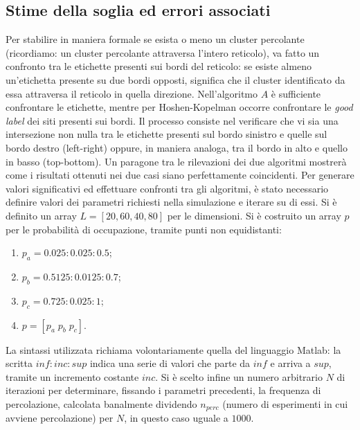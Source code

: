 \subsection*{Stime della soglia ed errori associati}
Per stabilire in maniera formale se esista o meno un cluster percolante (ricordiamo: un cluster 
percolante attraversa l'intero reticolo), va fatto un confronto tra le etichette presenti sui bordi
del reticolo: se esiste almeno un'etichetta presente su due bordi opposti, significa che il cluster 
identificato da essa attraversa il reticolo in quella direzione. 
Nell'algoritmo $A$ è sufficiente confrontare le etichette, mentre per Hoshen-Kopelman occorre 
confrontare le \textit{good label} dei siti presenti sui bordi.
Il processo consiste nel verificare che vi sia una intersezione non nulla tra le etichette 
presenti sul bordo sinistro e quelle sul bordo destro (left-right) oppure, in maniera analoga,
tra il bordo in alto e quello in basso (top-bottom).
Un paragone tra le rilevazioni dei due algoritmi mostrerà come i risultati ottenuti nei due casi 
siano perfettamente coincidenti.
Per generare valori significativi ed effettuare confronti tra gli algoritmi, è stato necessario 
definire valori dei parametri richiesti nella simulazione e iterare su di essi.
Si è definito un array $L = [20,60,40,80]$ per le dimensioni.
Si è costruito un array $p$ per le probabilità di occupazione, tramite punti non equidistanti:
\begin{enumerate}
    \item $p_a = 0.025:0.025:0.5$;
    \item $p_b = 0.5125:0.0125:0.7$;
    \item $p_c = 0.725:0.025:1$;
    \item $p = [p_a\;p_b\;p_c]$.
\end{enumerate}
La sintassi utilizzata richiama volontariamente quella del linguaggio Matlab: 
la scritta $inf : inc : sup$ indica una serie di valori che parte da $inf$ e arriva
a $sup$, tramite un incremento costante $inc$.
Si è scelto infine un numero arbitrario $N$ di iterazioni per determinare, fissando 
i parametri precedenti, la frequenza
di percolazione, calcolata banalmente dividendo $n_{perc}$ (numero di esperimenti in 
cui avviene percolazione) per $N$, in questo caso uguale a $1000$. 
